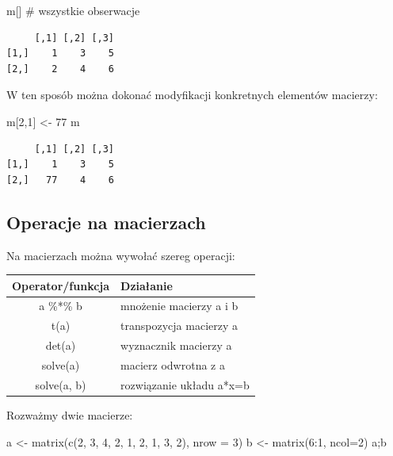 \documentclass[
  letterpaper,
  DIV=11,
  numbers=noendperiod]{scrreprt}
\newenvironment{Shaded}{\begin{snugshade}}{\end{snugshade}}
\newcommand{\AttributeTok}[1]{\textcolor[rgb]{0.40,0.45,0.13}{#1}}
\newcommand{\CommentTok}[1]{\textcolor[rgb]{0.37,0.37,0.37}{#1}}
\newcommand{\DecValTok}[1]{\textcolor[rgb]{0.68,0.00,0.00}{#1}}
\newcommand{\FunctionTok}[1]{\textcolor[rgb]{0.28,0.35,0.67}{#1}}
\newcommand{\NormalTok}[1]{\textcolor[rgb]{0.00,0.23,0.31}{#1}}
\newcommand{\OtherTok}[1]{\textcolor[rgb]{0.00,0.23,0.31}{#1}}
\newcommand{\SpecialCharTok}[1]{\textcolor[rgb]{0.37,0.37,0.37}{#1}}
\begin{document}
\begin{Shaded}
\begin{Highlighting}[]
\NormalTok{m[]    }\CommentTok{\# wszystkie obserwacje}
\end{Highlighting}
\end{Shaded}

\begin{verbatim}
     [,1] [,2] [,3]
[1,]    1    3    5
[2,]    2    4    6
\end{verbatim}

W ten sposób można dokonać modyfikacji konkretnych elementów macierzy:

\begin{Shaded}
\begin{Highlighting}[]
\NormalTok{m[}\DecValTok{2}\NormalTok{,}\DecValTok{1}\NormalTok{] }\OtherTok{\textless{}{-}} \DecValTok{77}
\NormalTok{m}
\end{Highlighting}
\end{Shaded}

\begin{verbatim}
     [,1] [,2] [,3]
[1,]    1    3    5
[2,]   77    4    6
\end{verbatim}

\hypertarget{operacje-na-macierzach}{%
\subsection{Operacje na macierzach}\label{operacje-na-macierzach}}

Na macierzach można wywołać szereg operacji:

\begin{longtable}[]{@{}cl@{}}
\toprule()
Operator/funkcja & Działanie \\
\midrule()
\endhead
a \%*\% b & mnożenie macierzy a i b \\
t(a) & transpozycja macierzy a \\
det(a) & wyznacznik macierzy a \\
solve(a) & macierz odwrotna z a \\
solve(a, b) & rozwiązanie układu a*x=b \\
\bottomrule()
\end{longtable}

Rozważmy dwie macierze:

\begin{Shaded}
\begin{Highlighting}[]
\NormalTok{a }\OtherTok{\textless{}{-}} \FunctionTok{matrix}\NormalTok{(}\FunctionTok{c}\NormalTok{(}\DecValTok{2}\NormalTok{, }\DecValTok{3}\NormalTok{, }\DecValTok{4}\NormalTok{, }\DecValTok{2}\NormalTok{, }\DecValTok{1}\NormalTok{, }\DecValTok{2}\NormalTok{, }\DecValTok{1}\NormalTok{, }\DecValTok{3}\NormalTok{, }\DecValTok{2}\NormalTok{), }\AttributeTok{nrow =} \DecValTok{3}\NormalTok{)}
\NormalTok{b }\OtherTok{\textless{}{-}} \FunctionTok{matrix}\NormalTok{(}\DecValTok{6}\SpecialCharTok{:}\DecValTok{1}\NormalTok{, }\AttributeTok{ncol=}\DecValTok{2}\NormalTok{)}
\NormalTok{a;b}
\end{Highlighting}
\end{Shaded}
\end{document}
